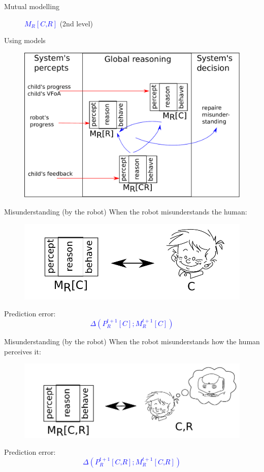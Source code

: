 \documentclass[compress]{beamer}
\begin{document}
\begin{frame}{Mutual modelling}
\begin{figure}[!tbp]
\begin{minipage}[b]{.4\textwidth}
		\caption{\textcolor{blue}{$M_R\left[\textit{C,R}\right]$} (2nd level)}
	\end{minipage}
	
\end{figure}
\end{frame}

\begin{frame}{Using models}
\centering
\begin{figure}
\includegraphics[width=0.8\columnwidth]{archi_general}
\end{figure}
\end{frame}



\begin{frame}{Misunderstanding (by the robot)}
When the robot misunderstands the human:
\centering
\begin{figure}
\includegraphics[width=0.8\columnwidth]{true_mis11}
\end{figure}

Prediction error:
\huge
\textcolor{blue}{$$\Delta \left(P^{t+1}_R\left[\textit{C}\right] ; M^{t+1}_R\left[\textit{C}\right]\right)$$}
\end{frame}

\begin{frame}{Misunderstanding (by the robot)}
When the robot misunderstands how the human perceives it:
\centering
\begin{figure}
\includegraphics[width=0.8\columnwidth]{true_mis12}
\end{figure}
Prediction error:
\huge
\textcolor{blue}{$$\Delta \left(P^{t+1}_R\left[\textit{C,R}\right] ; M^{t+1}_R\left[\textit{C,R}\right] \right)$$}
\end{frame}
\end{document}
